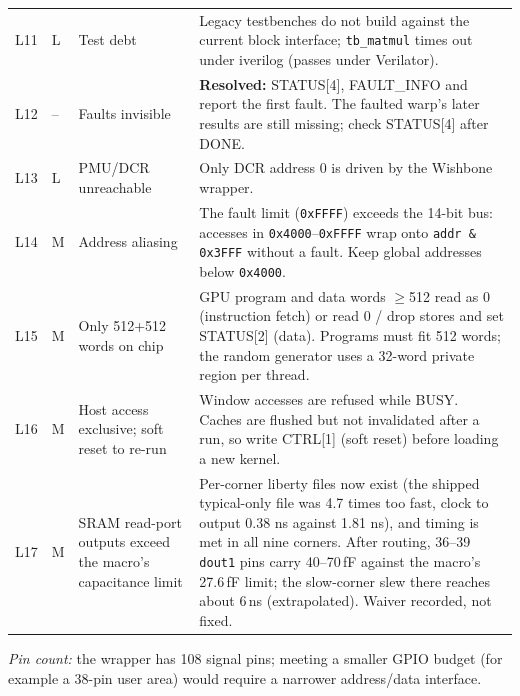 \documentclass[10pt,a4paper]{report}
\newcommand{\sig}[1]{\texttt{\detokenize{#1}}}
\begin{document}
\begin{longtable}{@{}llp{3.7cm}p{9.2cm}@{}}
L11 & L & Test debt & Legacy testbenches do not build against the current block interface; \texttt{tb\_matmul} times out under iverilog (passes under Verilator).\\
L12 & -- & Faults invisible & \textbf{Resolved:} STATUS[4], FAULT\_INFO and \sig{gpu_fault_pin} report the first fault. The faulted warp's later results are still missing; check STATUS[4] after DONE.\\
L13 & L & PMU/DCR unreachable & Only DCR address 0 is driven by the Wishbone wrapper.\\
L14 & M & Address aliasing & The fault limit (\texttt{0xFFFF}) exceeds the 14-bit bus: accesses in \texttt{0x4000}--\texttt{0xFFFF} wrap onto \texttt{addr \& 0x3FFF} without a fault. Keep global addresses below \texttt{0x4000}.\\
L15 & M & Only 512+512 words on chip & GPU program and data words $\ge$512 read as 0 (instruction fetch) or read 0 / drop stores and set STATUS[2] (data). Programs must fit 512 words; the random generator uses a 32-word private region per thread.\\
L16 & M & Host access exclusive; soft reset to re-run & Window accesses are refused while BUSY. Caches are flushed but not invalidated after a run, so write CTRL[1] (soft reset) before loading a new kernel.\\
L17 & M & SRAM read-port outputs exceed the macro's capacitance limit & Per-corner liberty files now exist (the shipped typical-only file was 4.7 times too fast, clock to output 0.38 ns against 1.81 ns), and timing is met in all nine corners. After routing, 36--39 \texttt{dout1} pins carry 40--70\,fF against the macro's 27.6\,fF limit; the slow-corner slew there reaches about 6\,ns (extrapolated). Waiver recorded, not fixed.\\
\bottomrule
\end{longtable}
\textit{Pin count:} the wrapper has 108 signal pins; meeting a smaller GPIO budget (for example a 38-pin user area) would require a narrower address/data interface.

\appendix
\end{document}
